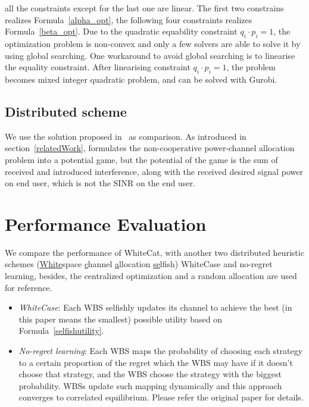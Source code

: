 		all the constraints except for the last one are linear.
The first two constrains realizes Formula~\ref{alpha_opt}, the following four constraints realizes Formula~\ref{beta_opt}.
Due to the quadratic equability constraint $q_i\cdot p_i =1$, the optimization problem is non-convex and only a few solvers are able to solve it by using global searching.
One workaround to avoid global searching is to linearise the equality constraint. 
After linearising constraint $q_i\cdot p_i =1$, the problem becomes mixed integer quadratic problem, and can be solved with Gurobi.

\subsection{Distributed scheme}
We use the solution proposed in~\cite{pimrc_2012} as comparison.
As introduced in section~\ref{relatedWork}, \cite{pimrc_2012} formulates the non-cooperative power-channel allocation problem into a potential game, but the potential of the game is the sum of received and introduced interference, along with the received desired signal power on end user, which is not the SINR on the end user.



\section{Performance Evaluation}
\label{simulation}
We compare the performance of WhiteCat, with another two distributed heuristic schemes (\underline{White}space \underline{c}hannel \underline{a}llocation \underline{se}lfish) WhiteCase and no-regret learning, besides, the centralized optimization and a random allocation are used for reference.

\begin{itemize}
\item \textit{WhiteCase}:  Each WBS selfishly updates its channel to achieve the best (in this paper means the smallest) possible utility based on Formula~\ref{selfishutility}.

\item \textit{No-regret learning}: Each WBS maps the probability of choosing each strategy to a certain proportion of the regret which the WBS may have if it doesn't choose that strategy, and the WBS choose the strategy with the biggest probability.  WBSs update such mapping dynamically and this approach converges to correlated equilibrium. Please refer the original paper \cite{hart00correlatedeq} for details.
		
\end{itemize}



